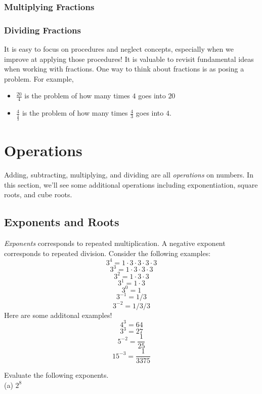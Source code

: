 \subsubsection{Multiplying Fractions}


\subsubsection{Dividing Fractions}

\begin{remark}
	It is easy to focus on procedures and neglect concepts, especially when we improve at applying those procedures!  
	It is valuable to revisit fundamental ideas when working with fractions.  
	One way to think about fractions is as posing a problem. 
	For example, 
	\begin{itemize}
		\item \(\frac{20}{4}\) is the problem of how many times \(4\) goes into \(20\)
		\item 	\(\frac{4}{\frac{4}{3}}\) is the problem of how many times \(\frac{4}{3}\) goes into \(4\). 
	\end{itemize}

\end{remark}



\newpage 
\section{Operations}

Adding, subtracting, multiplying, and dividing are all \emph{operations} on numbers.  In this section, we'll see some additional operations including exponentiation, square roots, and cube roots.  

\subsection{Exponents and Roots} 
\emph{Exponents} corresponds to repeated multiplication.  
A negative exponent corresponds to repeated division.  
Consider the following examples:
\[ 3^{4} = 1 \cdot 3 \cdot 3 \cdot 3 \cdot 3   \]
\[ 3^{3} = 1 \cdot 3 \cdot 3 \cdot 3    \]
\[ 3^{2} = 1 \cdot 3 \cdot 3   \]
\[ 3^{1} = 1 \cdot 3    \]
\[ 3^{0} = 1    \]
\[ 3^{-1} = 1 / 3  \]
\[ 3^{-2} = 1 / 3 / 3 \]
Here are some additonal examples!
\[ 4^{3} = 64 \]
\[ 3^{3} = 27  \]
\[ 5^{-2} = \frac{1}{25}  \]
\[  15^{-3} = \frac{1}{3375} \]
\begin{exercise}
	Evaluate the following exponents.
	\\ \hspace*{15mm} (a) \( 2^{8} \)
	\label{ex:basicexponents}
\end{exercise}



